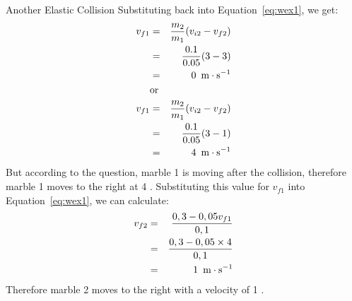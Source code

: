 \begin{wex}{Another Elastic Collision}
{Substituting back into Equation~\ref{eq:wex1}, we get:
\begin{eqnarray*}
{v}_{f1} &=& \frac{m_2}{m_1}({v}_{i2} - {v}_{f2})\\
&=& \frac{0.1}{0.05}(3 - 3)\\
&=&0\ \,\mathrm{m \cdot s^{-1}}\\
&\mbox{or}&\\
{v}_{f1} &=& \frac{m_2}{m_1}({v}_{i2} - {v}_{f2})\\
&=& \frac{0.1}{0.05}(3 - 1)\\
&=&4\ \,\mathrm{m \cdot s^{-1}}
\end{eqnarray*}
But according to the question, marble 1 is moving after the collision, therefore marble 1 moves to the right at 4 \ms.
Substituting this value for ${v}_{f1} $ into Equation~\ref{eq:wex1}, we can calculate:
\begin{eqnarray*}
v_{f2} & = &  \frac{0,3 - 0,05v_{f1}}{0,1} \\
& = & \frac{0,3 - 0,05\times4}{0,1} \\
& = & 1\ \,\mathrm{m \cdot s^{-1}}
\end{eqnarray*}
Therefore marble 2 moves to the right with a velocity of 1 \ms.
}
\end{wex}


